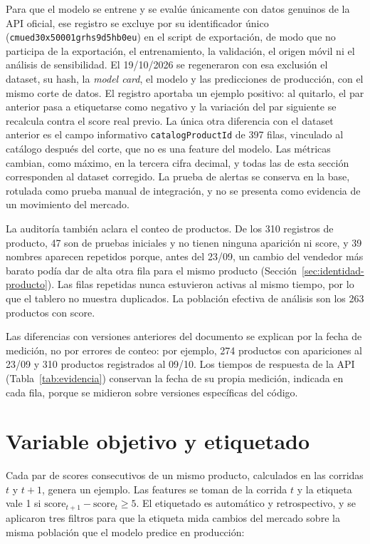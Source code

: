 Para que el modelo se entrene y se evalúe únicamente con datos genuinos de la API oficial, ese registro se excluye por su identificador único (\texttt{cmued30x50001grhs9d5hb0eu}) en el script de exportación, de modo que no participa de la exportación, el entrenamiento, la validación, el origen móvil ni el análisis de sensibilidad. El 19/10/2026 se regeneraron con esa exclusión el dataset, su hash, la \emph{model card}, el modelo y las predicciones de producción, con el mismo corte de datos. El registro aportaba un ejemplo positivo: al quitarlo, el par anterior pasa a etiquetarse como negativo y la variación del par siguiente se recalcula contra el score real previo. La única otra diferencia con el dataset anterior es el campo informativo \texttt{catalogProductId} de 397 filas, vinculado al catálogo después del corte, que no es una feature del modelo. Las métricas cambian, como máximo, en la tercera cifra decimal, y todas las de esta sección corresponden al dataset corregido. La prueba de alertas se conserva en la base, rotulada como prueba manual de integración, y no se presenta como evidencia de un movimiento del mercado.

La auditoría también aclara el conteo de productos. De los 310 registros de producto, 47 son de pruebas iniciales y no tienen ninguna aparición ni score, y 39 nombres aparecen repetidos porque, antes del 23/09, un cambio del vendedor más barato podía dar de alta otra fila para el mismo producto (Sección~\ref{sec:identidad-producto}). Las filas repetidas nunca estuvieron activas al mismo tiempo, por lo que el tablero no muestra duplicados. La población efectiva de análisis son los 263 productos con score.

Las diferencias con versiones anteriores del documento se explican por la fecha de medición, no por errores de conteo: por ejemplo, 274 productos con apariciones al 23/09 y 310 productos registrados al 09/10. Los tiempos de respuesta de la API (Tabla~\ref{tab:evidencia}) conservan la fecha de su propia medición, indicada en cada fila, porque se midieron sobre versiones específicas del código.

\section{Variable objetivo y etiquetado}\label{sec:variable-objetivo}

Cada par de scores consecutivos de un mismo producto, calculados en las corridas $t$ y $t+1$, genera un ejemplo. Las features se toman de la corrida $t$ y la etiqueta vale 1 si $\text{score}_{t+1} - \text{score}_t \geq 5$. El etiquetado es automático y retrospectivo, y se aplicaron tres filtros para que la etiqueta mida cambios del mercado sobre la misma población que el modelo predice en producción:

